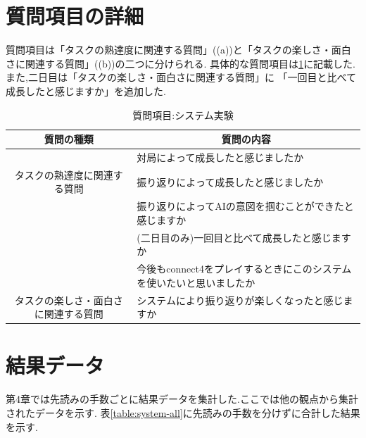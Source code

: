 \section{質問項目の詳細}
質問項目は「タスクの熟達度に関連する質問」((a))と「タスクの楽しさ・面白さに関連する質問」((b))の二つに分けられる.
具体的な質問項目は\ref{table:query}に記載した.また,二日目は「タスクの楽しさ・面白さに関連する質問」に
「一回目と比べて成長したと感じますか」を追加した.
\begin{table}[H]
    \caption{質問項目:システム実験}
    \label{table:query}
    \centering
	\small
    \begin{tabular}{c||l}
        \multicolumn{1}{c|}{質問の種類} & \multicolumn{1}{c}{質問の内容} \\ \hline \hline
        \multicolumn{1}{c||}{}&対局によって成長したと感じましたか \\
        タスクの熟達度に関連する質問 & 振り返りによって成長したと感じましたか \\
		\multicolumn{1}{c||}{}&振り返りによってAIの意図を掴むことができたと感じますか \\
		\multicolumn{1}{c||}{} & (二日目のみ)一回目と比べて成長したと感じますか\\\hline
        \multicolumn{1}{c||}{} & 今後もconnect4をプレイするときにこのシステムを使いたいと思いましたか \\
        タスクの楽しさ・面白さに関連する質問 & システムにより振り返りが楽しくなったと感じますか\\
    \end{tabular}
    
\end{table}
\section{結果データ}
第4章では先読みの手数ごとに結果データを集計した.ここでは他の観点から集計されたデータを示す.
表\ref{table:system-all}に先読みの手数を分けずに合計した結果を示す.
\begin{table}[H]
    \caption{結果:総合}
    \label{table:system-all}
    \scriptsize
    \centering
    
\end{table}

